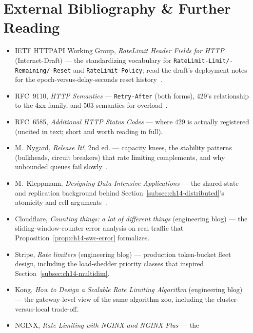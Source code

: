 \section{External Bibliography \& Further Reading}
\label{sec:ch14-bibliography}

\begin{itemize}
  \item IETF HTTPAPI Working Group, \emph{RateLimit Header Fields for HTTP}
        (Internet-Draft) --- the standardizing vocabulary for
        \texttt{RateLimit-Limit/-Remaining/-Reset} and
        \texttt{RateLimit-Policy}; read the draft's deployment notes for
        the epoch-versus-delay-seconds reset
        history~\cite{ietf_ratelimit_headers}.
  \item RFC~9110, \emph{HTTP Semantics} --- \texttt{Retry-After} (both
        forms), 429's relationship to the 4xx family, and 503 semantics for
        overload~\cite{rfc9110}.
  \item RFC~6585, \emph{Additional HTTP Status Codes} --- where 429 is
        actually registered (uncited in text; short and worth reading in
        full).
  \item M.~Nygard, \emph{Release It!}, 2nd ed. --- capacity knees, the
        stability patterns (bulkheads, circuit breakers) that rate limiting
        complements, and why unbounded queues fail
        slowly~\cite{nygard2018releaseit}.
  \item M.~Kleppmann, \emph{Designing Data-Intensive Applications} --- the
        shared-state and replication background behind
        Section~\ref{subsec:ch14-distributed}'s atomicity and cell
        arguments~\cite{kleppmann2017ddia}.
  \item Cloudflare, \emph{Counting things: a lot of different things}
        (engineering blog) --- the sliding-window-counter error analysis on
        real traffic that Proposition~\ref{prop:ch14-swc-error} formalizes.
  \item Stripe, \emph{Rate limiters} (engineering blog) --- production
        token-bucket fleet design, including the load-shedder priority
        classes that inspired Section~\ref{subsec:ch14-multidim}.
  \item Kong, \emph{How to Design a Scalable Rate Limiting Algorithm}
        (engineering blog) --- the gateway-level view of the same
        algorithm zoo, including the cluster-versus-local trade-off.
  \item NGINX, \emph{Rate Limiting with NGINX and NGINX Plus} --- the

\end{itemize}

